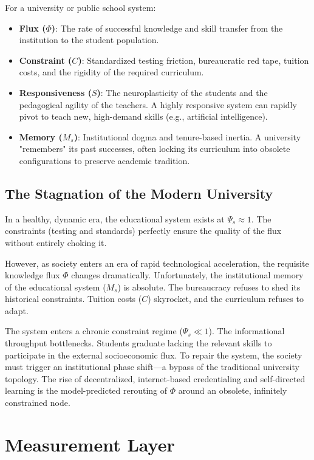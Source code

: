 \documentclass[11pt,a4paper]{article}
\begin{document}
For a university or public school system:
\begin{itemize}
    \item \textbf{Flux ($\Phi$)}: The rate of successful knowledge and skill transfer from the institution to the student population.
    \item \textbf{Constraint ($C$)}: Standardized testing friction, bureaucratic red tape, tuition costs, and the rigidity of the required curriculum.
    \item \textbf{Responsiveness ($S$)}: The neuroplasticity of the students and the pedagogical agility of the teachers. A highly responsive system can rapidly pivot to teach new, high-demand skills (e.g., artificial intelligence).
    \item \textbf{Memory ($M_s$)}: Institutional dogma and tenure-based inertia. A university "remembers" its past successes, often locking its curriculum into obsolete configurations to preserve academic tradition.
\end{itemize}

\subsection{The Stagnation of the Modern University}
In a healthy, dynamic era, the educational system exists at $\Psi_s \approx 1$. The constraints (testing and standards) perfectly ensure the quality of the flux without entirely choking it.

However, as society enters an era of rapid technological acceleration, the requisite knowledge flux $\Phi$ changes dramatically. Unfortunately, the institutional memory of the educational system ($M_s$) is absolute. The bureaucracy refuses to shed its historical constraints. Tuition costs ($C$) skyrocket, and the curriculum refuses to adapt.

The system enters a chronic constraint regime ($\Psi_s \ll 1$). The informational throughput bottlenecks. Students graduate lacking the relevant skills to participate in the external socioeconomic flux. To repair the system, the society must trigger an institutional phase shift---a bypass of the traditional university topology. The rise of decentralized, internet-based credentialing and self-directed learning is the model-predicted rerouting of $\Phi$ around an obsolete, infinitely constrained node.



\section{Measurement Layer}
\end{document}
